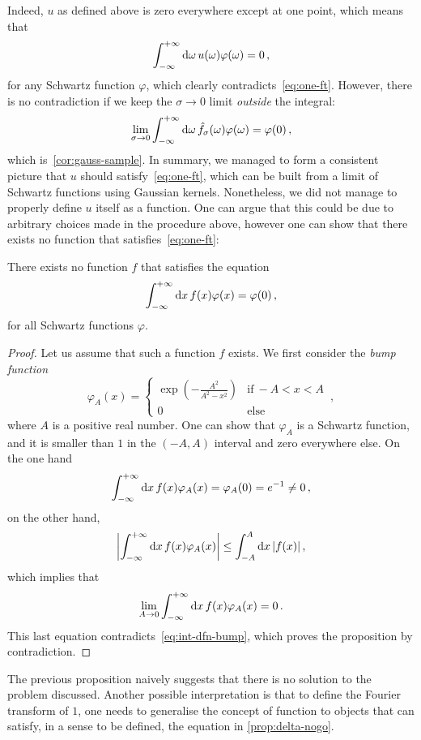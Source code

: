Indeed, $u$ as defined above is zero everywhere except at one point, which means that
\begin{equation}
	\int_{-\infty}^{+\infty}\mathrm{d}{\omega}\,u(\omega)\varphi(\omega)=0\,,
\end{equation}
for any Schwartz function $\varphi$, which clearly contradicts~\cref{eq:one-ft}. However,
there is no contradiction if we keep the $\sigma\to 0$ limit \emph{outside} the integral:
\begin{equation}
	\lim_{\sigma\to 0}\int_{-\infty}^{+\infty}\mathrm{d}{\omega}\,\hat{f}_{\sigma}(\omega)\varphi(\omega)=\varphi(0)\,,
\end{equation}
which is~\cref{cor:gauss-sample}. In summary, we managed to form a consistent picture that
$u$ should satisfy~\cref{eq:one-ft}, which can be built from a limit of Schwartz functions
using Gaussian kernels. Nonetheless, we did not manage to properly define $u$ itself as a
function. One can argue that this could be due to arbitrary choices made in the procedure
above, however one can show that there exists no function that satisfies~\cref{eq:one-ft}:
\begin{proposition}
	\label{prop:delta-nogo}
	There exists no function $f$ that satisfies the equation
	\begin{equation}
		\int_{-\infty}^{+\infty}\mathrm{d}{x}\,f(x)\varphi(x)=\varphi(0)\,,
	\end{equation}
	for all Schwartz functions $\varphi$.
\end{proposition}
\begin{proof}
	Let us assume that such a function $f$ exists. We first consider the \emph{bump
		function}
	\begin{equation}
		\varphi_A(x)=
		\begin{cases}
			\exp(-\frac{A^2}{A^2-x^2}) & \text{if}~-A<x<A \\
			0                          & \text{else}
		\end{cases}\,,
	\end{equation}
	where $A$ is a positive real number. One can show that $\varphi_A$ is a Schwartz
	function, and it is smaller than $1$ in the $(-A,A)$ interval and zero everywhere else.
	On the one hand
	\begin{equation}
		\int_{-\infty}^{+\infty}\mathrm{d}{x}\,f(x)\varphi_A(x)=\varphi_A(0)=e^{-1}\neq 0\,,
		\label{eq:int-dfn-bump}
	\end{equation}
	on the other hand,
	\begin{equation}
		\left|\int_{-\infty}^{+\infty}\mathrm{d}{x}\,f(x)\varphi_A(x)\right|\leq\int_{-A}^A\mathrm{d} x\,|f(x)|\,,
	\end{equation}
	which implies that
	\begin{equation}
		\lim_{A\to 0}\int_{-\infty}^{+\infty}\mathrm{d}{x}\,f(x)\varphi_A(x)=0\,.
	\end{equation}
	This last equation contradicts~\cref{eq:int-dfn-bump}, which proves the proposition by
	contradiction.
\end{proof}
The previous proposition naively suggests that there is no solution to the problem
discussed. Another possible interpretation is that to define the Fourier transform of $1$,
one needs to generalise the concept of function to objects that can satisfy, in a sense to
be defined, the equation in \cref{prop:delta-nogo}.
